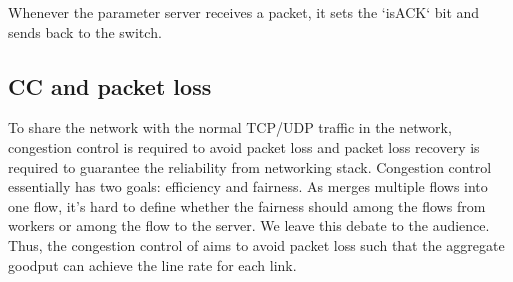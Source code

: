 Whenever the parameter server receives a packet, it sets the `isACK` bit and sends back to the switch.


\subsection{CC and packet loss}
To share the network with the normal TCP/UDP traffic in the network,
congestion control is required to avoid packet loss and packet loss 
recovery is required to guarantee the reliability from networking stack.
Congestion control essentially has two goals: efficiency and fairness.
As \system merges multiple flows into one flow, it's hard to define whether 
the fairness should among the flows from workers or among the flow to the server.
We leave this debate to the audience.
Thus, the congestion control of \system aims to avoid packet loss such that 
the aggregate goodput can achieve the line rate for each link.

